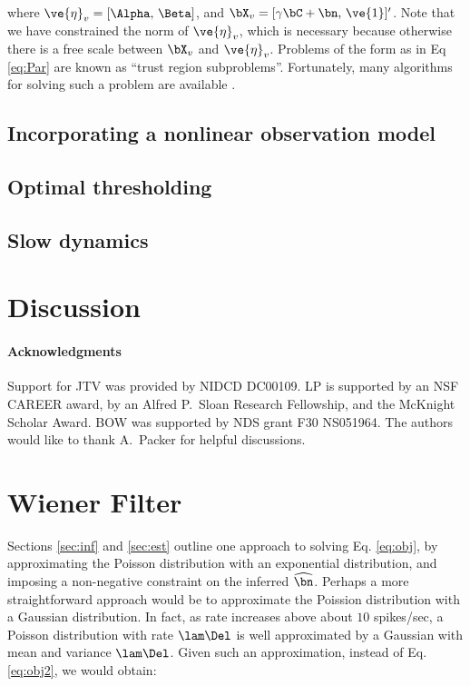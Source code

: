 \documentclass[12pt]{article}
\newcommand{\hnm}{\widehat{\bn}}
\begin{document}
\noindent where $\ve{\eta}_v=[\Alpha, \, \Beta]$, and $\bX_v=[\gamma \bC + \bn, \, \ve{1}]'$. Note that we have constrained the norm of $\ve{\eta}_v$, which is necessary because otherwise there is a free scale between $\bX_v$ and $\ve{\eta}_v$.  Problems of the form as in Eq \eqref{eq:Par} are known as ``trust region subproblems''.  Fortunately, many algorithms for solving such a problem are available \cite{Fortin00}.  


\subsection{Incorporating a nonlinear observation model}

\subsection{Optimal thresholding}

\subsection{Slow dynamics}

\section{Discussion}

\paragraph{Acknowledgments}

Support for JTV was provided by NIDCD DC00109. LP is supported by an NSF CAREER award, by an Alfred P.\ Sloan Research Fellowship, and the McKnight Scholar Award. BOW was supported by NDS grant F30 NS051964. The authors would like to thank A.\ Packer for helpful discussions.


%

%
%


\appendix

\section{Wiener Filter}

Sections \ref{sec:inf} and \ref{sec:est} outline one approach to solving Eq. \eqref{eq:obj}, by approximating the Poisson distribution with an exponential distribution, and imposing a non-negative constraint on the inferred $\hnm$.  Perhaps a more straightforward approach would be to approximate the Poission distribution with a Gaussian distribution.  In fact, as rate increases above about $10$ spikes/sec, a Poisson distribution with rate $\lam \Del$ is well approximated by a Gaussian with mean and variance $\lam \Del$.  Given such an approximation, instead of Eq. \eqref{eq:obj2}, we would obtain:
\end{document}
